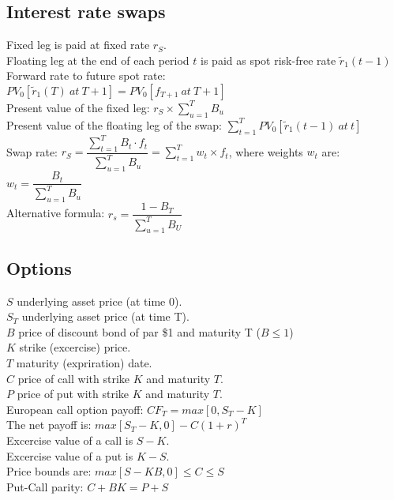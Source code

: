 \subsection*{Interest rate swaps}
Fixed leg is paid at fixed rate $r_S$. \\
Floating leg at the end of each period $t$ is paid as spot risk-free rate $\tilde{r}_1(t-1)$\\
Forward rate to future spot rate:\\
$PV_0[\tilde{r}_1(T)\ at\ T + 1] = PV_0[f_{T+1}\ at\ T + 1]$\\
Present value of the fixed leg:
$r_S\times\sum_{u=1}^TB_u$\\
Present value of the floating leg of the swap: $\sum_{t=1}^TPV_0[\tilde{r}_1(t-1)\ at\ t]$\\
Swap rate:
$r_S = \dfrac{\sum_{t=1}^TB_t\cdot f_t}{\sum_{u=1}^TB_u} = \sum_{t=1}^Tw_t\times f_t$, where weights $w_t$ are:
$w_t=\dfrac{B_t}{\sum_{u=1}^TB_u}$\\
Alternative formula:
$r_s=\dfrac{1-B_T}{\sum_{u=1}^TB_U}$
\subsection*{Options}
$S$ underlying asset price (at time 0).\\
$S_T$ underlying asset price (at time T).\\
$B$ price of discount bond of par \$1 and maturity T ($B \leq 1$)\\
$K$ strike (excercise) price.\\
$T$ maturity (expriration) date.\\
$C$ price of call with strike $K$ and maturity $T$.\\
$P$ price of put with strike $K$ and maturity $T$.\\
European call option payoff:
$CF_T=max[0, S_T - K]$\\
The net payoff is: $max[S_T-K, 0] - C(1+r)^T$\\
Excercise value of a call is $S-K$.\\
Excercise value of a put is $K-S$.\\
Price bounds are: $max[S-KB,0] \leq C \leq S$\\
Put-Call parity: $C + BK = P + S$
